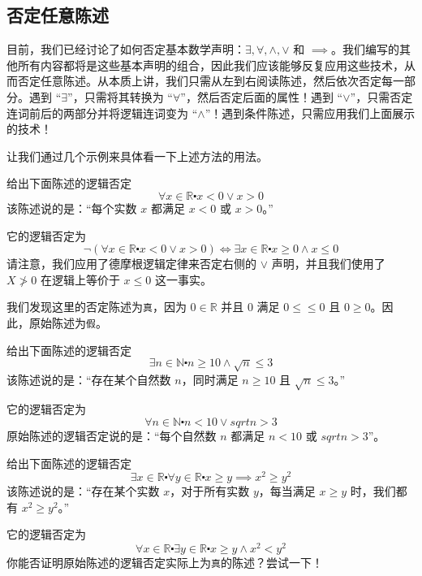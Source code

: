 \subsection{否定任意陈述}

目前，我们已经讨论了如何否定基本数学声明：$\exists, \forall, \land , \lor$ 和 $\implies$。我们编写的其他所有内容都将是这些基本声明的组合，因此我们应该能够反复应用这些技术，从而否定任意陈述。从本质上讲，我们只需从左到右阅读陈述，然后依次否定每一部分。遇到 ``$\exists$''，只需将其转换为 ``$\forall$''，然后否定后面的属性！遇到 ``$\lor$''，只需否定连词前后的两部分并将逻辑连词变为 ``$\land$''！遇到条件陈述，只需应用我们上面展示的技术！

让我们通过几个示例来具体看一下上述方法的用法。

\begin{example}
    给出下面陈述的逻辑否定
    \[\forall x \in \mathbb{R} \centerdot x < 0 \lor x > 0\]
    该陈述说的是：``每个实数 $x$ 都满足 $x < 0$ 或 $x > 0$。''

    它的逻辑否定为
    \[\neg (\forall x \in \mathbb{R} \centerdot x < 0 \lor x > 0) \iff \exists x \in \mathbb{R} \centerdot x \ge 0 \land x \le 0\]
    请注意，我们应用了德摩根逻辑定律来否定右侧的 $\lor$ 声明，并且我们使用了 $X \ngtr 0$ 在逻辑上等价于 $x \le 0$ 这一事实。

    我们发现这里的否定陈述为\verb|真|，因为 $0 \in \mathbb{R}$ 并且 $0$ 满足 $0≤ \le 0$ 且 $0 \ge 0$。因此，原始陈述为\verb|假|。
\end{example}

\begin{example}
    给出下面陈述的逻辑否定
    \[\exists n \in \mathbb{N} \centerdot n \ge 10 \land \sqrt{n} \le 3\]
    该陈述说的是：``存在某个自然数 $n$，同时满足 $n \ge 10$ 且 $\sqrt{n} \le 3$。''

    它的逻辑否定为
    \[\forall n \in \mathbb{N} \centerdot n < 10 \lor sqrt{n} > 3\]
    原始陈述的逻辑否定说的是：``每个自然数 $n$ 都满足 $n < 10$ 或 $sqrt{n} > 3$''。
\end{example}

\begin{example}
    给出下面陈述的逻辑否定
    \[\exists x \in \mathbb{R} \centerdot \forall y \in \mathbb{R} \centerdot x \ge y \implies x^2 \ge y^2\]
    该陈述说的是：``存在某个实数 $x$，对于所有实数 $y$，每当满足 $x \ge y$ 时，我们都有 $x^2 \ge y^2$。''

    它的逻辑否定为
    \[\forall x \in \mathbb{R} \centerdot \exists y \in \mathbb{R} \centerdot x \ge y \land x^2 < y^2\]
    你能否证明原始陈述的逻辑否定实际上为\verb|真|的陈述？尝试一下！
\end{example}

